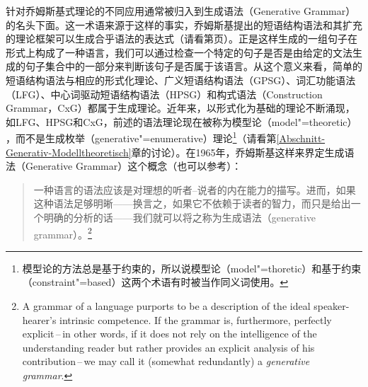 针对乔姆斯基式理论的不同应用通常被归入到生成语法（Generative Grammar）的名头下面。这一术语来源于这样的事实，乔姆斯基提出的短语结构语法和其扩充的理论框架可以生成合乎语法的表达式（请看第\pageref{Seite-generiert}页）。正是这样生成的一组句子在形式上构成了一种语言，我们可以通过检查一个特定的句子是否是由给定的文法生成的句子集合中的一部分来判断该句子是否属于该语言。从这个意义来看，简单的短语结构语法与相应的形式化理论、广义短语结构语法（GPSG）、词汇功能语法（LFG）、中心词驱动短语结构语法（HPSG）和构式语法（Construction
Grammar，CxG）都属于生成理论。近年来，以形式化为基础的理论不断涌现，如LFG、HPSG和CxG，前述的语法理论现在被称为模型论（model"=theoretic） ，而不是生成枚举（generative"=enumerative）理论\footnote{%
模型论的方法总是基于约束的，所以说模型论（model"=thoretic）和基于约束（constraint"=based）这两个术语有时被当作同义词使用。}（请看第\ref{Abschnitt-Generativ-Modelltheoretisch}章的讨论）。在1965年，乔姆斯基这样来界定生成语法（Generative Grammar）这个概念（也可以参考\citealp[]{Chomsky95a-u}）：
\begin{quotation}
一种语言的语法应该是对理想的听者--说者的内在能力的描写。进而，如果这种语法足够明晰——换言之，如果它不依赖于读者的智力，而只是给出一个明确的分析的话——我们就可以将之称为生成语法（generative
  grammar）。\citep[]{Chomsky65a}\footnote{%
A grammar of a language purports to be a description of the ideal speaker-hearer's intrinsic
competence. If the grammar is, furthermore, perfectly explicit\,--\,in other words, if it does not
rely on the intelligence of the understanding reader but rather provides an explicit analysis of
his contribution\,--\,we may call it (somewhat redundantly) a \emph{generative
  grammar}. }
\end{quotation}

